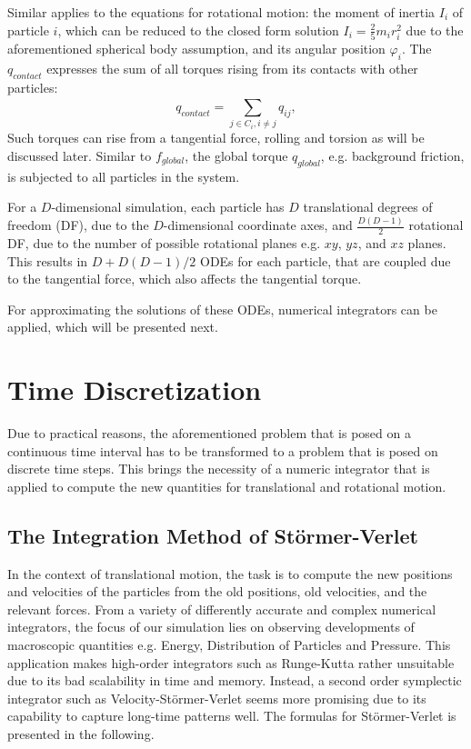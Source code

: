 \documentclass[11pt,
               a4paper,
               bibtotoc,
               idxtotoc,
               headsepline,
               footsepline,
               footexclude,
               BCOR12mm,
               DIV13,
               openany,   %
               ]
               {scrbook}
\begin{document}
Similar applies to the equations for rotational motion: the moment of inertia $I_i$ of particle $i$, which can be reduced to the closed form solution $I_i = \frac{2}{5} m_i  r_i^2$ due to the aforementioned spherical body assumption, and its angular position $\varphi_i$. The $q_{contact}$ expresses the sum of all torques rising from its contacts with other particles:
\begin{equation}
	q_{contact} = \sum_{j \in C_{i}, i \neq j}^{} q_{ij},
\end{equation}
Such torques  can rise from a tangential force, rolling and torsion as will be discussed later.
Similar to $f_{global}$, the global torque $q_{global}$, e.g. background friction, is subjected to all particles in the system.

For a $D$-dimensional simulation, each particle has $D$ translational degrees of freedom (DF), due to the $D$-dimensional coordinate axes, and $\frac{D(D-1)}{2}$ rotational DF, due to the number of possible rotational planes e.g. $xy$, $yz$, and $xz$ planes. This results in  $D + D(D-1)/2$ ODEs for each particle, that are coupled due to the tangential force, which also affects the tangential torque.

For approximating the solutions of these ODEs, numerical integrators can be applied, which will be presented next.


\chapter{Time Discretization}
Due to practical reasons, the aforementioned problem that is posed on a continuous time interval has to be transformed to a problem that is posed on discrete time steps. This brings the necessity of a numeric integrator that is applied to compute the new quantities for translational and rotational motion.

\section{The Integration Method of Störmer-Verlet}
In the context of translational motion, the task is to compute the new positions and velocities of the particles from the old positions, old velocities, and the relevant forces. From a variety of differently accurate and complex numerical integrators, the focus of our simulation lies on observing developments of macroscopic quantities e.g. Energy, Distribution of Particles and Pressure. This application makes high-order integrators such as Runge-Kutta rather unsuitable due to its bad scalability in time and memory. Instead, a second order symplectic integrator such as Velocity-Störmer-Verlet seems more promising due to its capability to capture long-time patterns well. The formulas for Störmer-Verlet is presented in the following.
\end{document}
